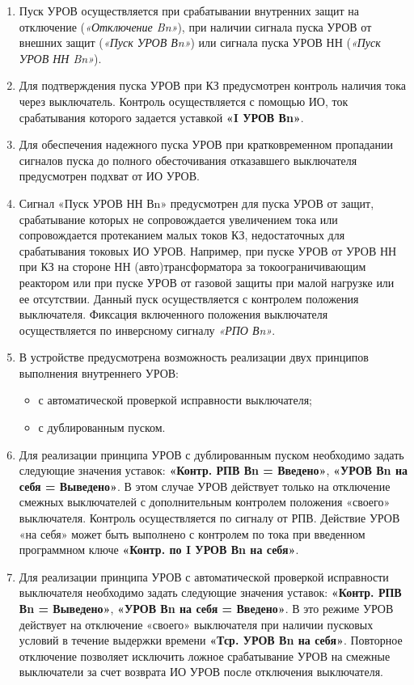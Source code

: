 \begin{enumerate}
\begin{enumerate}
\item
Пуск УРОВ осуществляется при срабатывании внутренних защит на отключение (\textit{«Отключение Bn»}), при наличии сигнала пуска УРОВ от внешних защит (\textit{«Пуск УРОВ Вn»}) или сигнала пуска УРОВ НН (\textit{«Пуск УРОВ НН Bn»}).

\item
Для подтверждения пуска УРОВ при КЗ предусмотрен контроль наличия тока через выключатель.
Контроль осуществляется с помощью ИО, ток срабатывания которого задается уставкой \textbf{«I УРОВ Вn»}.

\item
Для обеспечения надежного пуска УРОВ при кратковременном пропадании сигналов пуска до полного обесточивания отказавшего выключателя предусмотрен подхват от ИО УРОВ.

\item
Сигнал «Пуск УРОВ НН Вn» предусмотрен для пуска УРОВ от защит, срабатывание которых не сопровождается увеличением тока или сопровождается протеканием малых токов КЗ, недостаточных для срабатывания токовых ИО УРОВ.
Например, при пуске УРОВ от УРОВ НН при КЗ на стороне НН (авто)трансформатора за токоограничивающим реактором или при пуске УРОВ от газовой защиты при малой нагрузке или ее отсутствии.
Данный пуск осуществляется с контролем положения выключателя.
Фиксация включенного положения выключателя осуществляется по инверсному сигналу \textit{«РПО Вn»}.

\item
В устройстве предусмотрена возможность реализации двух принципов выполнения внутреннего УРОВ:
\begin{itemize}
\item с автоматической проверкой исправности выключателя;
\item с дублированным пуском.
\end{itemize}

\item
Для реализации принципа УРОВ с дублированным пуском необходимо задать следующие значения уставок: \textbf{«Контр. РПВ Вn = Введено»}, \textbf{«УРОВ Вn на себя = Выведено»}.
В этом случае УРОВ действует только на отключение смежных выключателей с дополнительным контролем положения «своего» выключателя.
Контроль осуществляется по сигналу от РПВ.
Действие УРОВ «на себя» может быть выполнено с контролем по тока при введенном программном ключе \textbf{«Контр. по I УРОВ Вn на себя»}.

\item
Для реализации принципа УРОВ с автоматической проверкой исправности выключателя необходимо задать следующие значения уставок: \textbf{«Контр. РПВ Вn = Выведено»}, \textbf{«УРОВ Вn на себя = Введено»}.
В это режиме УРОВ действует на отключение «своего» выключателя при наличии пусковых условий в течение выдержки времени \textbf{«Тср. УРОВ Вn на себя»}.
Повторное отключение позволяет исключить ложное срабатывание УРОВ на смежные выключатели за счет возврата ИО УРОВ после отключения выключателя.


\end{enumerate}
\end{enumerate}
